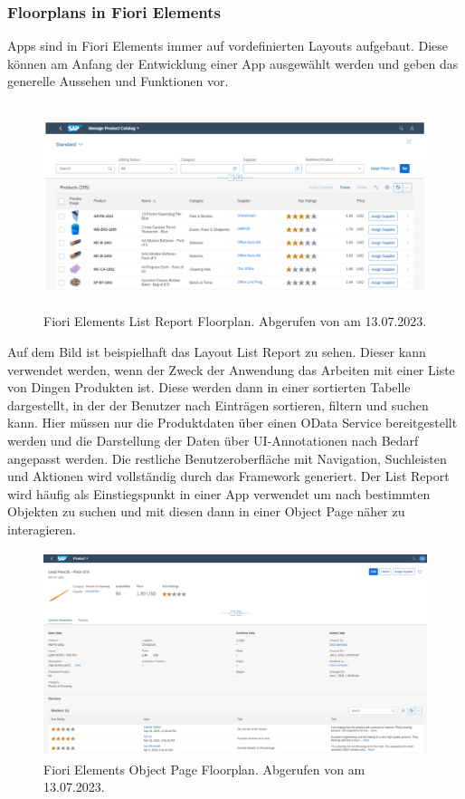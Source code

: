 \subsubsection{Floorplans in Fiori Elements}

Apps sind in Fiori Elements immer auf vordefinierten Layouts aufgebaut. Diese können am Anfang der Entwicklung einer App ausgewählt werden und geben das generelle Aussehen und Funktionen vor.

\begin{figure}[H]
 \centering
 \includegraphics[height=6cm]{Bilder/Fiori_Elements_List_Floorplan.png}
 \caption[Fiori Elements List Report Floorplan]{Fiori Elements List Report Floorplan. Abgerufen von \cite{sap_ui5-docu_2022} am 13.07.2023.}
 \label{fig:iso_norm}
\end{figure}

Auf dem Bild ist beispielhaft das Layout List Report zu sehen. Dieser kann verwendet werden, wenn der Zweck der Anwendung das Arbeiten mit einer Liste von Dingen \zB Produkten ist. Diese werden dann in einer sortierten Tabelle dargestellt, in der der Benutzer nach Einträgen sortieren, filtern und suchen kann. Hier müssen nur die Produktdaten über einen OData Service bereitgestellt werden und die Darstellung der Daten über UI-Annotationen nach Bedarf angepasst werden. Die restliche Benutzeroberfläche mit Navigation, Suchleisten und Aktionen wird vollständig durch das Framework generiert. Der List Report wird häufig als Einstiegspunkt in einer App verwendet um nach bestimmten Objekten zu suchen und mit diesen dann in einer Object Page näher zu interagieren.

\begin{figure}[H]
 \centering
 \includegraphics[height=6cm]{Bilder/Fiori_Elements_Object_Floorplan.png}
 \caption[Fiori Elements Object Page Floorplan]{Fiori Elements Object Page Floorplan. Abgerufen von \cite{sap_ui5-docu_2022} am 13.07.2023.}
 \label{fig:iso_norm}
\end{figure}

